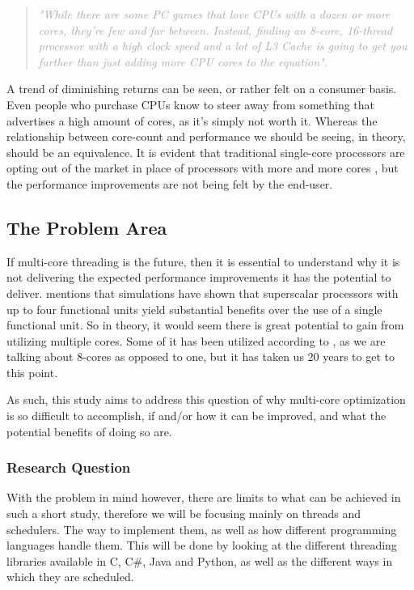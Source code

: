 \documentclass[12pt,a4paper]{article}
\begin{document}
\begin{quote}
    \textit{\textcolor{darkgray}{"While there are some PC games that love CPUs with a dozen or more cores, they’re few and far between. 
    Instead, finding an 8-core, 16-thread processor with a high clock speed and a lot of L3 Cache is going to get you further than just adding more CPU cores to the equation". }}
\end{quote}

A trend of diminishing returns can be seen, or rather felt on a consumer basis. Even people who purchase CPUs know to steer away from something that advertises a high amount of cores, as it's simply not worth it. Whereas the relationship between core-count and performance we should be seeing, in theory, should be an equivalence. It is evident that traditional single-core processors are opting out of the market in place of processors with more and more cores \parencite{Smith2023}, but the performance improvements are not being felt by the end-user.

\subsection{The Problem Area}

If multi-core threading is the future, then it is essential to understand why it is not delivering the expected performance improvements it has the potential to deliver. \cite[p. 12]{Rauber2023} mentions that simulations have shown that superscalar processors with up to four functional units yield substantial benefits over the use of a single functional unit. So in theory, it would seem there is great potential to gain from utilizing multiple cores. Some of it has been utilized according to \textcite{Thomas2025}, as we are talking about 8-cores as opposed to one, but it has taken us 20 years to get to this point.

As such, this study aims to address this question of why multi-core optimization is so difficult to accomplish, if and/or how it can be improved, and what the potential benefits of doing so are. 

\subsubsection{Research Question}

With the problem in mind however, there are limits to what can be achieved in such a short study, therefore we will be focusing mainly on threads and schedulers. The way to implement them, as well as how different programming languages handle them. This will be done by looking at the different threading libraries available in C, C\#, Java and Python, as well as the different ways in which they are scheduled.
\end{document}
